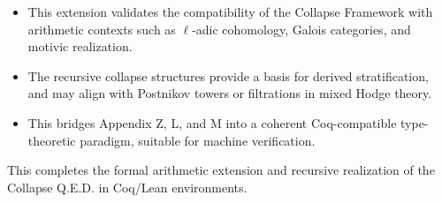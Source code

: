 \documentclass[11pt]{article}
\begin{document}
\begin{itemize}
  \item This extension validates the compatibility of the Collapse Framework with arithmetic contexts such as $\ell$-adic cohomology, Galois categories, and motivic realization.
  \item The recursive collapse structures provide a basis for derived stratification, and may align with Postnikov towers or filtrations in mixed Hodge theory.
  \item This bridges Appendix Z, L, and M into a coherent Coq-compatible type-theoretic paradigm, suitable for machine verification.
\end{itemize}

\begin{center}
\end{center}


This completes the formal arithmetic extension and recursive realization of the Collapse Q.E.D. in Coq/Lean environments.
\end{document}
